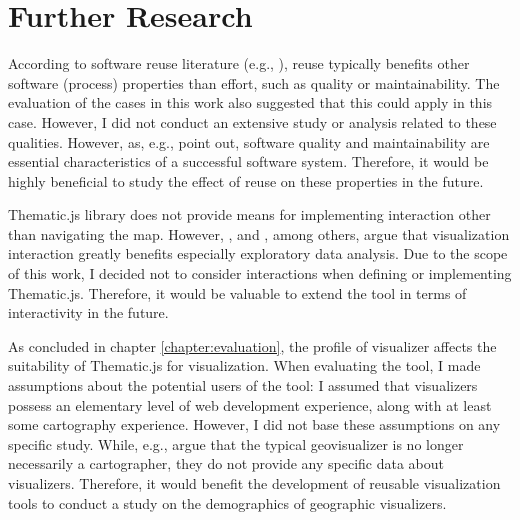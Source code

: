 \section{Further Research}

According to software reuse literature (e.g., \citealt{mohagheghi_quality_2007,frakes_success_1994}), reuse typically benefits other software (process) properties than effort, such as quality or maintainability. The evaluation of the cases in this work also suggested that this could apply in this case. However, I did not conduct an extensive study or analysis related to these qualities. However, as, e.g., \citet{kitchenham_software_1996} point out, software quality and maintainability are essential characteristics of a successful software system. Therefore, it would be highly beneficial to study the effect of reuse on these properties in the future.

Thematic.js library does not provide means for implementing interaction other than navigating the map. However, \citet{andrienko_interactive_1999}, and \citet[chap.~21]{slocum_thematic_2014}, among others, argue that visualization interaction greatly benefits especially exploratory data analysis. Due to the scope of this work, I decided not to consider interactions when defining or implementing Thematic.js. Therefore, it would be valuable to extend the tool in terms of interactivity in the future.

As concluded in chapter \ref{chapter:evaluation}, the profile of visualizer affects the suitability of Thematic.js for visualization. When evaluating the tool, I made assumptions about the potential users of the tool: I assumed that visualizers possess an elementary level of web development experience, along with at least some cartography experience. However, I did not base these assumptions on any specific study. While, e.g., \citet{slocum_thematic_2014} argue that the typical geovisualizer is no longer necessarily a cartographer, they do not provide any specific data about visualizers. Therefore, it would benefit the development of reusable visualization tools to conduct a study on the demographics of geographic visualizers. 

